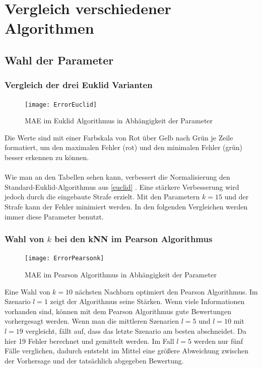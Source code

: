 \section{Vergleich verschiedener Algorithmen}\label{s.Ergebnisse}\raggedbottom

\subsection{Wahl der Parameter}

\subsubsection{Vergleich der drei Euklid Varianten}\label{s.keuclid}
\begin{figure}[htbp!]
	\centering
	\texttt{[image: ErrorEuclid]}
	\caption{MAE im Euklid Algorithmus in Abhängigkeit der Parameter}
	\label{fig:ErrorEuclid}
	
\end{figure}
Die Werte sind mit einer Farbskala von Rot über Gelb nach Grün je Zeile formatiert, um den maximalen Fehler (rot) und den minimalen Fehler (grün) besser erkennen zu können.\\\\
Wie man an den Tabellen sehen kann, verbessert die Normalisierung den Standard-Euklid-Algorithmus aus \autoref{euclid} . Eine stärkere Verbesserung wird jedoch durch die eingebaute Strafe erzielt. Mit den Parametern $k = 15$ und der Strafe kann der Fehler minimiert werden. In den folgenden Vergleichen werden immer diese Parameter benutzt.
\clearpage

\subsubsection{Wahl von $k$ bei den kNN im Pearson Algorithmus}\label{s.kpearson}
\begin{figure}[htbp!]
\centering
\texttt{[image: ErrorPearsonk]}
\caption{MAE im Pearson Algorithmus in Abhängigkeit der Parameter }
\label{fig:ErrorPearsonk}
\end{figure}
Eine Wahl von $k = 10$ nächsten Nachbarn optimiert den Pearson Algorithmus. Im Szenario $l = 1$ zeigt der Algorithmus seine Stärken. Wenn viele Informationen vorhanden sind, können mit dem Pearson Algorithmus gute Bewertungen vorhergesagt werden. Wenn man die mittleren Szenarien $l = 5$ und $l = 10$ mit $l = 19$ vergleicht, fällt auf, dass das letzte Szenario am besten abschneidet. Da hier 19 Fehler berechnet und gemittelt werden. Im Fall $l = 5$ werden nur fünf Fälle verglichen, dadurch entsteht im Mittel eine größere Abweichung zwischen der Vorhersage und der tatsächlich abgegeben Bewertung.
\clearpage

